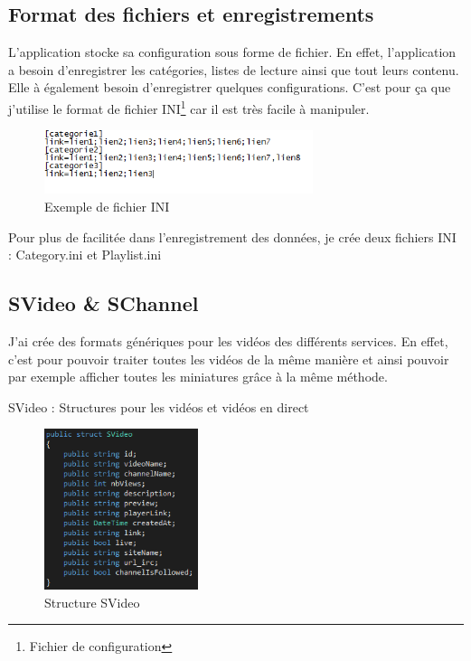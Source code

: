 \documentclass[11pt]{report} %
\begin{document}
		\subsection{Format des fichiers et enregistrements}
		L'application stocke sa configuration sous forme de fichier. En effet, l'application a besoin d'enregistrer les catégories, listes de lecture ainsi que tout leurs contenu. Elle à également besoin d'enregistrer quelques configurations. C'est pour ça que j'utilise le format de fichier INI\footnote{Fichier de configuration} car il est très facile à manipuler. 
		
		\begin{figure}[h]
			\center
			\includegraphics[width=0.7\textwidth]{../img/inifile.png}
			\caption{Exemple de fichier INI}
			\label{inifile}
		\end{figure}
		
		Pour plus de facilitée dans l'enregistrement des données, je crée deux fichiers INI : Category.ini et Playlist.ini
			
		\subsection{SVideo \& SChannel}
			J'ai crée des formats génériques pour les vidéos des différents services. En effet, c'est pour pouvoir traiter toutes les vidéos de la même manière et ainsi pouvoir par exemple afficher toutes les miniatures grâce à la même méthode.
			
			SVideo : Structures pour les vidéos et vidéos en direct
			
			\begin{figure}[h]
				\center
				\includegraphics[width=0.4\textwidth]{../img/SVideo.png}
				\caption{Structure SVideo}
				\label{SVideo}
			\end{figure}
			
\end{document}
